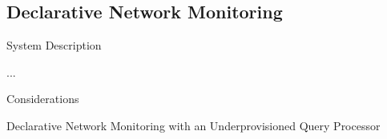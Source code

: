 \subsection*{Declarative Network Monitoring}
\label{dec-netmon}

\begin{structure}
	\item System Description
	\item ...
	\item Considerations
\end{structure}

Declarative Network Monitoring with an Underprovisioned Query Processor \cite{dec-net-mon}
